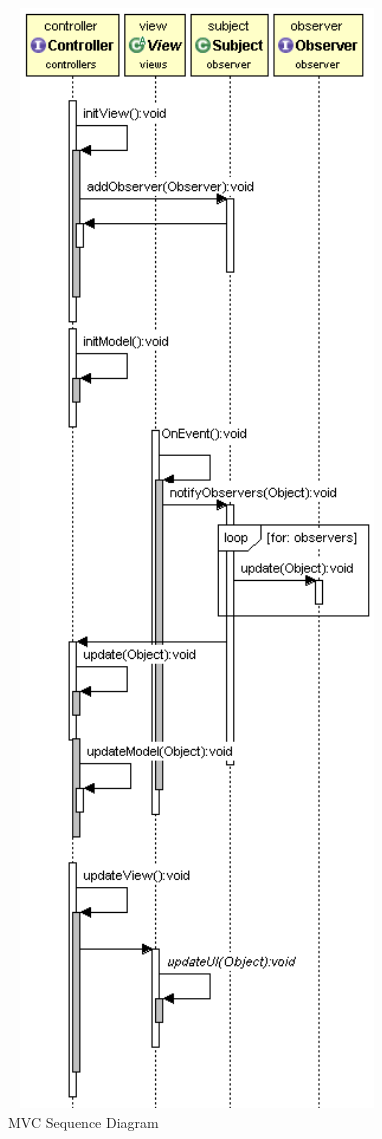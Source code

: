 \documentclass[12pt]{article}
\begin{document}
\begin{figure}[h!]
  \centering
  \includegraphics[width=100mm]{mvc_sequence.png}
  \caption{MVC Sequence Diagram}
\end{figure}
\end{document}
